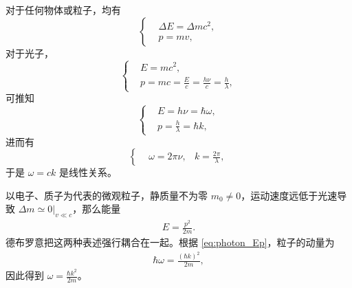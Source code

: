 对于任何物体或粒子，均有
\begin{equation}
    \left\{
        \begin{aligned}
            &\Delta E = \Delta m c^2,\\
            &p = mv,
        \end{aligned}
    \right.
\end{equation}
对于光子，
\begin{equation}
    \left\{
        \begin{aligned}
            &E = mc^2, \\
            &p = mc = \frac Ec = \frac{h\nu}c = \frac h\lambda, 
        \end{aligned}
    \right.
\end{equation}
可推知
\begin{equation}
    \left\{
        \begin{aligned}
            &E = h \nu = \hbar\omega , \\
            &p = \frac{h}{\lambda} = \hbar k, 
        \end{aligned}
    \right.
    \label{eq:photon_Ep}
\end{equation}
进而有
\begin{equation}
    \left\{
        \begin{aligned}
            &\omega = 2\pi\nu,
            &k = \frac{2\pi}{\lambda}, 
        \end{aligned}
    \right.
\end{equation}
于是 $\omega = ck$ 是线性关系。


以电子、质子为代表的微观粒子，静质量不为零 $m_0 \neq 0$，运动速度远低于光速导致 $\Delta m \simeq 0 |_{v \ll c}$，那么能量
\begin{eqnarray}
    E = \frac{p^2}{2m}.
\end{eqnarray}
德布罗意把这两种表述强行耦合在一起。根据 \eqref{eq:photon_Ep}，粒子的动量为
\begin{eqnarray}
    \hbar\omega = \frac{(\hbar k)^2}{2m},
\end{eqnarray}
因此得到 $\omega = \frac{\hbar k^2}{2m}$。

